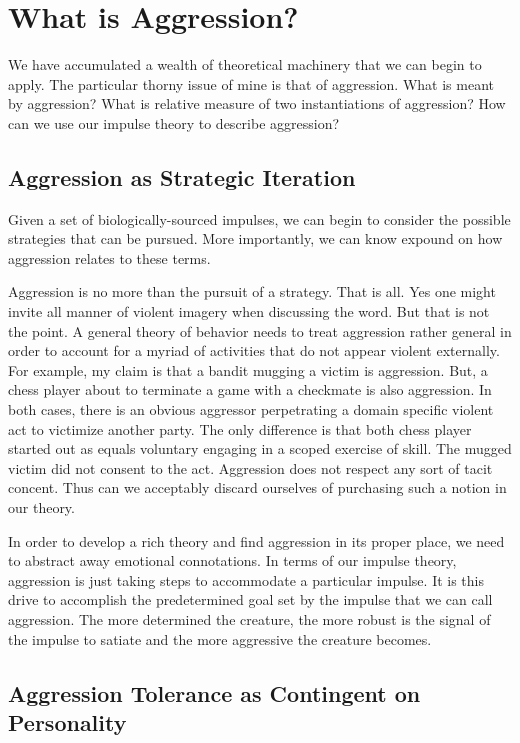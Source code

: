 \documentclass[12pt]{article}
\begin{document}
\section{What is Aggression?}
We have accumulated a wealth of theoretical machinery that we can begin to apply.
The particular thorny issue of mine is that of aggression.
What is meant by aggression?
What is relative measure of two instantiations of aggression?
How can we use our impulse theory to describe aggression?

\subsection{Aggression as Strategic Iteration}
Given a set of biologically-sourced impulses, we can begin to consider the possible strategies that can be pursued.
More importantly, we can know expound on how aggression relates to these terms.

Aggression is no more than the pursuit of a strategy.
That is all.
Yes one might invite all manner of violent imagery when discussing the word.
But that is not the point.
A general theory of behavior needs to treat aggression rather general in order to account for a myriad of activities that do not appear violent externally.
For example, my claim is that a bandit mugging a victim is aggression.
But, a chess player about to terminate a game with a checkmate is also aggression.
In both cases, there is an obvious aggressor perpetrating a domain specific violent act to victimize another party.
The only difference is that both chess player started out as equals voluntary engaging in a scoped exercise of skill.
The mugged victim did not consent to the act.
Aggression does not respect any sort of tacit concent.
Thus can we acceptably discard ourselves of purchasing such a notion in our theory.

In order to develop a rich theory and find aggression in its proper place, we need to abstract away emotional connotations.
In terms of our impulse theory, aggression is just taking steps to accommodate a particular impulse.
It is this drive to accomplish the predetermined goal set by the impulse that we can call aggression.
The more determined the creature, the more robust is the signal of the impulse to satiate and the more aggressive the creature becomes.

\subsection{Aggression Tolerance as Contingent on Personality}
\end{document}
